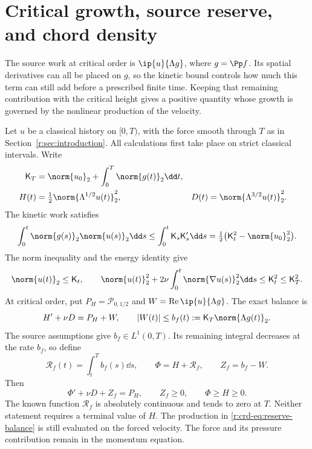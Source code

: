 \section{Critical growth, source reserve, and chord density}
\label{r:sec:critical-reserve-density}

The source work at critical order is \(\ip{u}{\Lambda g}\), where
\(g=\Pp f\). Its spatial derivatives can all be placed on \(g\), so the
kinetic bound controls how much this term can still add before a prescribed
finite time. Keeping that remaining contribution with the critical height
gives a positive quantity whose growth is governed by the nonlinear
production of the velocity.

Let \(u\) be a classical history on \([0,T)\), with the force smooth through
\(T\) as in Section~\ref{r:sec:introduction}. All calculations first take place
on strict classical intervals. Write
\begin{equation}
 \begin{aligned}
 \mathsf K_T&=\norm{u_0}_2+\int_0^T\norm{g(t)}_2\dd t,\\
 H(t)&=\tfrac12\norm{\Lambda^{1/2}u(t)}_2^2,
 &D(t)&=\norm{\Lambda^{3/2}u(t)}_2^2.
 \end{aligned}
 \label{r:crd-eq:height}
\end{equation}
The kinetic work satisfies
\[
 \int_0^t\norm{g(s)}_2\norm{u(s)}_2\dd s
 \le\int_0^t\mathsf K_s\mathsf K_s'\dd s
 =\tfrac12\bigl(\mathsf K_t^2-\norm{u_0}_2^2\bigr).
\]
The norm inequality and the energy identity give
\begin{equation}
 \norm{u(t)}_2\le\mathsf K_t,\qquad
 \norm{u(t)}_2^2+2\nu\int_0^t\norm{\nabla u(s)}_2^2\dd s
 \le\mathsf K_t^2\le\mathsf K_T^2.
 \label{r:crd-eq:kinetic}
\end{equation}
At critical order, put \(P_H=\mathcal P_{0,1/2}\) and
\(W=\operatorname{Re}\ip{u}{\Lambda g}\). The exact balance is
\[
 H'+\nu D=P_H+W,\qquad
 |W(t)|\le b_f(t):=\mathsf K_T\norm{\Lambda g(t)}_2.
\]
The source assumptions give \(b_f\in L^1(0,T)\). Its remaining integral
decreases at the rate \(b_f\), so define
\begin{equation}
 \mathscr R_f(t)=\int_t^T b_f(s)\dd s,\qquad
 \Phi=H+\mathscr R_f,\qquad Z_f=b_f-W.
 \label{r:crd-eq:reserve}
\end{equation}
Then
\begin{equation}
 \Phi'+\nu D+Z_f=P_H,\qquad
 Z_f\ge0,\qquad \Phi\ge H\ge0.
 \label{r:crd-eq:reserve-balance}
\end{equation}
The known function \(\mathscr R_f\) is absolutely continuous and tends to
zero at \(T\). Neither statement requires a terminal value of \(H\).
The production in \eqref{r:crd-eq:reserve-balance} is still evaluated on the
forced velocity. The force and its pressure contribution remain in the
momentum equation.

